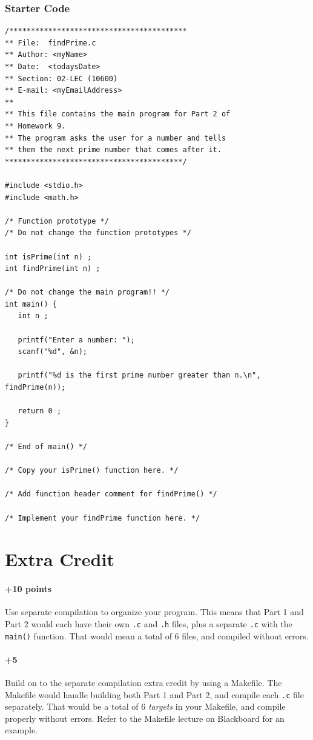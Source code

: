 \documentclass[letter,11pt]{article}
\begin{document}
\subsubsection*{Starter Code}
\begin{verbatim}
/*****************************************
** File:  findPrime.c
** Author: <myName>
** Date:  <todaysDate>
** Section: 02-LEC (10600)
** E-mail: <myEmailAddress>
**
** This file contains the main program for Part 2 of
** Homework 9.
** The program asks the user for a number and tells
** them the next prime number that comes after it.
*****************************************/

#include <stdio.h>
#include <math.h>

/* Function prototype */
/* Do not change the function prototypes */

int isPrime(int n) ;
int findPrime(int n) ;

/* Do not change the main program!! */
int main() {
   int n ;

   printf("Enter a number: ");
   scanf("%d", &n);

   printf("%d is the first prime number greater than n.\n", findPrime(n));

   return 0 ;
}

/* End of main() */

/* Copy your isPrime() function here. */

/* Add function header comment for findPrime() */

/* Implement your findPrime function here. */
\end{verbatim}

\section*{Extra Credit}
\paragraph{+10 points}Use separate compilation to organize your program. This means that Part 1 and Part 2 would each have their own \texttt{.c} and \texttt{.h} files, plus a separate \texttt{.c} with the \texttt{main()} function. That would mean a total of 6 files, and compiled without errors.
\paragraph{+5}Build on to the separate compilation extra credit by using a Makefile. The Makefile would handle building both Part 1 and Part 2, and compile each \texttt{.c} file separately. That would be a total of 6 \textit{targets} in your Makefile, and compile properly without errors. Refer to the Makefile lecture on Blackboard for an example.
\end{document}
